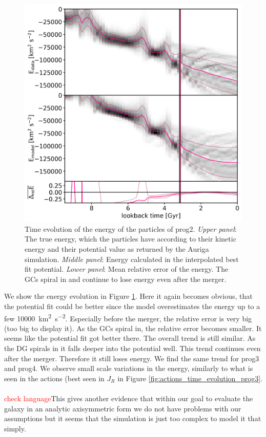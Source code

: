 \begin{figure}[htbp]
\captionsetup{format=plain}
    \centering
	\includegraphics[width=\textwidth]{plots/Dynamics/prog2/energy_time_evolution_gcwodisk_hist_mean.png}
	\caption{Time evolution of the energy of the particles of prog2. \textit{Upper panel}: The true energy, which the particles have according to their kinetic energy and their potential value as returned by the Auriga simulation. \textit{Middle panel}: Energy calculated in the interpolated best fit potential. \textit{Lower panel}: Mean relative error of the energy. The \acp{GC} spiral in and continue to lose energy even after the merger.  }\label{fig:energy_time_evolution_prog2}
\end{figure}

We show the energy evolution in Figure \ref{fig:energy_time_evolution_prog2}. Here it again becomes obvious, that the potential fit could be better since the model overestimates the energy up to a few \SI{10000}{km^{2}.s^{-2}}. Especially before the merger, the relative error is very big (too big to display it). As the \acp{GC} spiral in, the relative error becomes smaller. It seems like the potential fit got better there. The overall trend is still similar. As the \ac{DG} spirals in it falls deeper into the potential well. This trend continues even after the merger. Therefore it still loses energy. We find the same trend for prog3 and prog4. We observe small scale variations in the energy, similarly to what is seen in the actions (best seen in $J_R$ in Figure \ref{fig:actions_time_evolution_prog3}.
\\\\\textcolor{red}{check language}This gives another evidence that within our goal to evaluate the galaxy in an analytic axisymmetric form we do not have problems with our assumptions but it seems that the simulation is just too complex to model it that simply.

